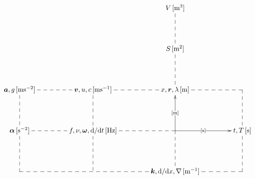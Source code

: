 \documentclass[a4j,10pt]{jarticle}
\makeatletter
\def\uni#1{[\!\unit{#1}]}
\def\cell#1#2{#1\,\uni{#2}}
\def\dotted#1{\ar@{--}[#1]}
\def\arr#1#2#3#4#5{\ar[#1] |-(#2){\uni{#3}} _(#4){#5}}
\def\arrmiddle#1#2#3{\arr{#1}{0.5}{#2}{0.45}{#3}}
\def\E{\bm E}
\def\m{\bm m}
\makeatother
\begin{document}
\[\xymatrix@=0.60in{
  & & \cell{V}{m^3} \dotted{d} \\
  & & \cell{S}{m^2} \dotted{d} \\
  \cell{\bm a,g}{ms^{-2}} \dotted{r}\dotted{d} & \cell{\bm v,u,c}{ms^{-1}} \dotted{r}\dotted{d} & \cell{x,\bm r,\lambda}{m} \dotted{r} & *=0{}\dotted{d} \\
  \cell{\bm\alpha}{s^{-2}}\dotted{d}\dotted{r} & \cell{f,\nu,\bm\omega,\dd/\dd t}{Hz} \dotted{r}\dotted{d} & *=0{} \arrmiddle{u}{m}{}\arrmiddle{r}{s}{}\dotted{d} & \cell{t,T}{s} \dotted{d} \\
  *=0{}\dotted{rr} & & \cell{\bm k,\dd/\dd x,\nabla}{m^{-1}} \dotted{r} & *=0{}
}\]
\vspace{1cm}

\def\mtop{\ar@{->}[lu]_(.5){\bm p=m\bm v}}
\def\mtoF{\ar@/^1pc/[llu]^(.5){\bm F=m\bm a}}
\def\mtoE{\ar@/^1pc/[lluu]^(.5){\begin{smallmatrix}E=mc^2,\frac12m\abs{\bm v}^2\\E=mgh\end{smallmatrix}}}
\def\ItoE{\ar@/_2.5pc/[ll]_(.5){\begin{smallmatrix}E=\frac12I\omega^2\\\bm N=\sf I \cdot \bm\alpha+\bm\omega\times(\sf I\cdot \bm \omega)\end{smallmatrix}}}
\def\mtoI{\ar@/^2pc/[uu]^(.6){I=mr^2}}
\def\ktoE{\ar@/^2pc/[uu]^(.6){E=\frac12kx^2}}
\def\ktoF{\ar@{->}[u]_(.5){F=kx}}
\def\ptoF{\ar@{<->}[l]^(.5){\bm F=\dd \bm p/\dd t}_(.5){\bm I = \int \bm F \dd t}}
\def\ItoL{\ar@{->}[l]_(.5){\bm L=\sf I\cdot\bm\omega}}
\def\ptoL{\ar@{->}[u]_(.5){\begin{smallmatrix}\bm L=\bm r \times \bm p\\\Delta x \Delta p \ge \hbar / 2\end{smallmatrix}}}
\def\WtoP{\ar@{->}[l]^(.6){P={\dd W}/{\dd t}}}
\def\LtoN{\ar@{<->}[l]_(.45){\begin{smallmatrix}\bm N = \dd \bm L / \dd t\\E=\hbar\omega\end{smallmatrix}}^(.4){S=\int L\dd t}}
\def\FtoN{\ar@{->}[u]_(.5){\begin{smallmatrix}\bm N = \bm r \times \bm F\\ W = F s\\\bm F=-\grad V\end{smallmatrix}}}
\def\rhotoP{\ar@{->}[uull]^(.5){P=\rho g h}}
\def\mtorho{\ar@{<->}[ddd]^(.5){\begin{smallmatrix}\rho=m/V\\m=\int_V \rho(\bm r)\dd V\end{smallmatrix}}}
\end{document}
